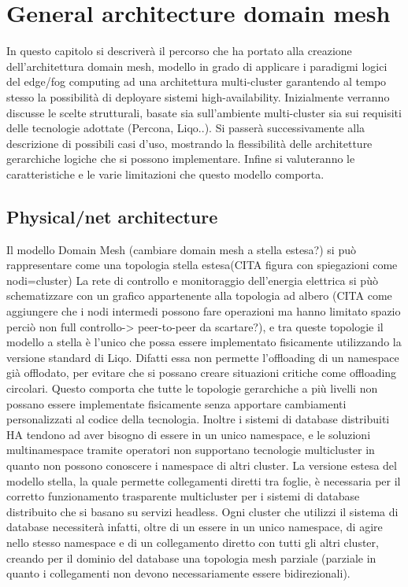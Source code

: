 \chapter{General architecture domain mesh}
In questo capitolo si descriverà il percorso che ha portato alla creazione dell'architettura domain mesh, modello in grado di applicare i paradigmi logici del edge/fog computing ad una architettura multi-cluster garantendo al tempo stesso la possibilità di deployare sistemi high-availability. Inizialmente verranno discusse le scelte strutturali, basate sia sull'ambiente multi-cluster sia sui requisiti delle tecnologie adottate (Percona, Liqo..). Si passerà successivamente alla descrizione di possibili casi d'uso, mostrando la flessibilità delle architetture gerarchiche logiche che si possono implementare. Infine si valuteranno le caratteristiche e le varie limitazioni che questo modello comporta. 

\section{Physical/net architecture}
Il modello Domain Mesh (cambiare domain mesh a stella estesa?) si può rappresentare come una topologia stella estesa(CITA figura con spiegazioni come nodi=cluster)
La rete di controllo e monitoraggio dell'energia elettrica si pùò schematizzare con un grafico appartenente alla topologia ad albero (CITA come aggiungere che i nodi intermedi possono fare operazioni ma hanno limitato spazio perciò non full controllo-> peer-to-peer da scartare?), e tra queste topologie il modello a stella è l'unico che possa essere implementato fisicamente utilizzando la versione standard di Liqo. Difatti essa non permette l'offloading di un namespace già offlodato, per evitare che si possano creare situazioni critiche come offloading circolari. Questo comporta che tutte le topologie gerarchiche a più livelli non possano essere implementate fisicamente senza apportare cambiamenti personalizzati al codice della tecnologia. Inoltre i sistemi di database distribuiti HA tendono ad aver bisogno di essere in un unico namespace, e le soluzioni multinamespace tramite operatori non supportano tecnologie multicluster in quanto non possono conoscere i namespace di altri cluster.
La versione estesa del modello stella, la quale permette collegamenti diretti tra foglie, è necessaria per il corretto funzionamento trasparente multicluster per i sistemi di database distribuito che si basano su servizi headless. Ogni cluster che utilizzi il sistema di database necessiterà infatti, oltre di un essere in un unico namespace, di agire nello stesso namespace e di un collegamento diretto con tutti gli altri cluster, creando per il dominio del database una topologia mesh parziale (parziale in quanto i collegamenti non devono necessariamente essere bidirezionali).

